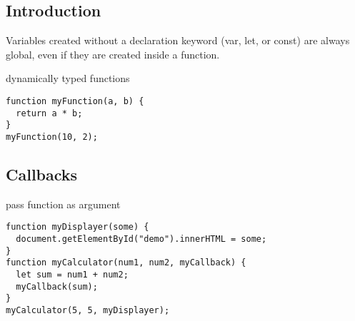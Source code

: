 
\subsection{Introduction}

Variables created without a declaration keyword (var, let, or const) are always global, even if they are created inside a function.

dynamically typed functions

\begin{verbatim}
function myFunction(a, b) {
  return a * b;
}
myFunction(10, 2);
\end{verbatim}

\subsection{Callbacks}

pass function as argument

\begin{verbatim}
function myDisplayer(some) {
  document.getElementById("demo").innerHTML = some;
}
function myCalculator(num1, num2, myCallback) {
  let sum = num1 + num2;
  myCallback(sum);
}
myCalculator(5, 5, myDisplayer);
\end{verbatim}


